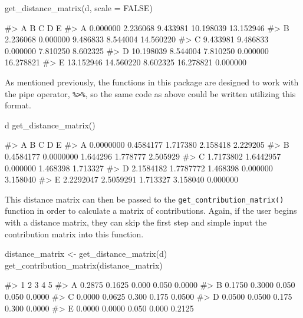 \begin{Schunk}
\begin{Sinput}
get_distance_matrix(d, scale = FALSE)
\end{Sinput}
\begin{Soutput}
#>           A         B        C         D         E
#> A  0.000000  2.236068 9.433981 10.198039 13.152946
#> B  2.236068  0.000000 9.486833  8.544004 14.560220
#> C  9.433981  9.486833 0.000000  7.810250  8.602325
#> D 10.198039  8.544004 7.810250  0.000000 16.278821
#> E 13.152946 14.560220 8.602325 16.278821  0.000000
\end{Soutput}
\end{Schunk}

As mentioned previously, the functions in this package are designed to
work with the  pipe operator,
\texttt{\%\textgreater{}\%}, so the same code as above could be written
utilizing this format.

\begin{Schunk}
\begin{Sinput}
d %
  get_distance_matrix()
\end{Sinput}
\begin{Soutput}
#>           A         B        C        D        E
#> A 0.0000000 0.4584177 1.717380 2.158418 2.229205
#> B 0.4584177 0.0000000 1.644296 1.778777 2.505929
#> C 1.7173802 1.6442957 0.000000 1.468398 1.713327
#> D 2.1584182 1.7787772 1.468398 0.000000 3.158040
#> E 2.2292047 2.5059291 1.713327 3.158040 0.000000
\end{Soutput}
\end{Schunk}

This distance matrix can then be passed to the
\texttt{get\_contribution\_matrix()} function in order to calculate a
matrix of contributions. Again, if the user begins with a distance
matrix, they can skip the first step and simple input the contribution
matrix into this function.

\begin{Schunk}
\begin{Sinput}
distance_matrix <- get_distance_matrix(d)
get_contribution_matrix(distance_matrix)
\end{Sinput}
\begin{Soutput}
#>        1      2     3     4      5
#> A 0.2875 0.1625 0.000 0.050 0.0000
#> B 0.1750 0.3000 0.050 0.050 0.0000
#> C 0.0000 0.0625 0.300 0.175 0.0500
#> D 0.0500 0.0500 0.175 0.300 0.0000
#> E 0.0000 0.0000 0.050 0.000 0.2125
\end{Soutput}
\end{Schunk}


